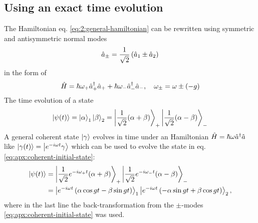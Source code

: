 \subsection{Using an exact time evolution}
\label{apx:general-coherent-state-evolution}
The Hamiltonian eq. \eqref{eq:2:general-hamiltonian} can be rewritten using symmetric and antisymmetric normal modes
\begin{equation}
  \hat{a}_\pm = \frac{1}{\sqrt{2}} \left( \hat{a}_1 \pm \hat{a}_2 \right)
\end{equation}
in the form of 
\begin{equation}
  \hat{H} = \hbar \omega_+ \hat{a}^\dagger_+\hat{a}_+ + \hbar \omega_- \hat{a}^\dagger_-\hat{a}_- ,  \quad  \omega_\pm = \omega \pm (-g)
\end{equation}
The time evolution of a state
\begin{equation}\label{eq:apx:coherent-initial-state}
  \ket{\psi(t)} = \ket{\alpha}_1\ket{\beta}_2 = \ket{\frac{1}{\sqrt{2}} (\alpha + \beta)}_+\ket{\frac{1}{\sqrt{2}} (\alpha - \beta)}_-
\end{equation}
A general coherent state $\ket{\gamma}$ evolves in time under an Hamiltonian $\hat{H} = \hbar \omega \hat{a}^\dagger \hat{a}$ like $\ket{\gamma(t)} = \ket{e^{-i\omega t} \gamma}$ which can be used to evolve the state in eq. \eqref{eq:apx:coherent-initial-state}:
\begin{align}
  \ket{\psi(t)} 
  &= \ket{ \frac{1}{\sqrt{2}} e^{-i\omega_+t} (\alpha + \beta) }_+\ket{ \frac{1}{\sqrt{2}} e^{-i\omega_-t} (\alpha - \beta) }_- \\
  &= \ket{ e^{-i\omega t} \left( \alpha \cos gt - \beta \sin gt \right) }_1 \ket{ e^{-i\omega t} \left( - \alpha \sin gt + \beta \cos gt \right) }_2, 
\end{align}
where in the last line the back-transformation from the $\pm$-modes \eqref{eq:apx:coherent-initial-state} was used.
